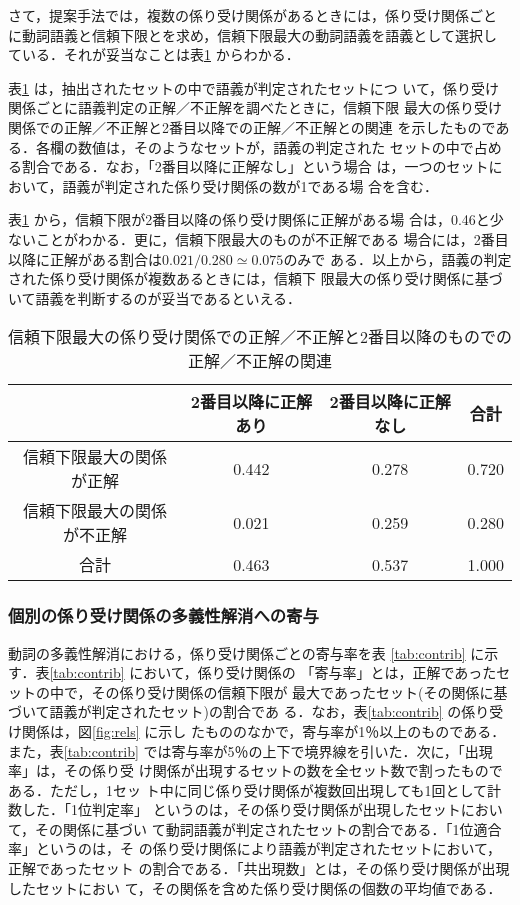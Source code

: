 さて，提案手法では，複数の係り受け関係があるときには，係り受け関係ごと
に動詞語義と信頼下限とを求め，信頼下限最大の動詞語義を語義として選択し
ている．それが妥当なことは表\ref{tab:1and2} からわかる．

表\ref{tab:1and2} は，抽出されたセットの中で語義が判定されたセットにつ
いて，係り受け関係ごとに語義判定の正解／不正解を調べたときに，信頼下限
最大の係り受け関係での正解／不正解と2番目以降での正解／不正解との関連
を示したものである．各欄の数値は，そのようなセットが，語義の判定された
セットの中で占める割合である．なお，「2番目以降に正解なし」という場合
は，一つのセットにおいて，語義が判定された係り受け関係の数が1である場
合を含む．

表\ref{tab:1and2} から，信頼下限が2番目以降の係り受け関係に正解がある場
合は，0.46と少ないことがわかる．更に，信頼下限最大のものが不正解である
場合には，2番目以降に正解がある割合は$0.021/0.280 \simeq 0.075$のみで
ある．以上から，語義の判定された係り受け関係が複数あるときには，信頼下
限最大の係り受け関係に基づいて語義を判断するのが妥当であるといえる．

\begin{table}[htbp]
  \begin{center}
    \leavevmode
    \caption{信頼下限最大の係り受け関係での正解／不正解と2番目以降のものでの正解／不正解の関連}
    \label{tab:1and2}
    \bigskip
    \begin{tabular}{c|cc|c}
      & 2番目以降に正解あり & 2番目以降に正解なし & 合計 \\ \hline
      信頼下限最大の関係が正解   & 0.442 & 0.278 & 0.720 \\
      信頼下限最大の関係が不正解 & 0.021 & 0.259 & 0.280 \\ \hline
      合計        & 0.463 & 0.537 & 1.000
    \end{tabular}
  \end{center}
\end{table}

\subsubsection{個別の係り受け関係の多義性解消への寄与}

動詞の多義性解消における，係り受け関係ごとの寄与率を表
\ref{tab:contrib} に示す．表\ref{tab:contrib} において，係り受け関係の
「寄与率」とは，正解であったセットの中で，その係り受け関係の信頼下限が
最大であったセット(その関係に基づいて語義が判定されたセット)の割合であ
る．なお，表\ref{tab:contrib} の係り受け関係は，図\ref{fig:rels} に示し
たもののなかで，寄与率が1％以上のものである．また，表\ref{tab:contrib}
では寄与率が5％の上下で境界線を引いた．次に，「出現率」は，その係り受
け関係が出現するセットの数を全セット数で割ったものである．ただし，1セッ
ト中に同じ係り受け関係が複数回出現しても1回として計数した．「1位判定率」
というのは，その係り受け関係が出現したセットにおいて，その関係に基づい
て動詞語義が判定されたセットの割合である．「1位適合率」というのは，そ
の係り受け関係により語義が判定されたセットにおいて，正解であったセット
の割合である．「共出現数」とは，その係り受け関係が出現したセットにおい
て，その関係を含めた係り受け関係の個数の平均値である．

